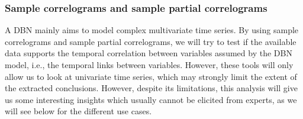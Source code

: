 \subsubsection{Sample correlograms and sample partial correlograms}

A DBN mainly aims to model complex multivariate time series. By using sample correlograms and sample partial correlograms, we will try to test if the available data supports the temporal correlation between variables assumed by the DBN model, i.e., the temporal links between variables. However, these tools will only allow us to look at univariate time series, which may strongly limit the extent of the extracted conclusions. However, despite its limitations, this analysis will give us some interesting insights which usually cannot be elicited from experts, as we will see below for the different use cases.  

